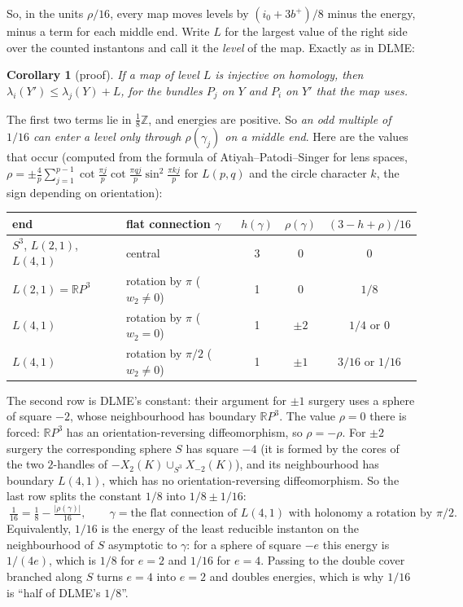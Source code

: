 \documentclass[10pt]{amsart}
\numberwithin{equation}{section}
\theoremstyle{compact}
\newtheorem{corollary}[theorem]{Corollary}
\theoremstyle{definition}
\newcommand{\Z}{\mathbb Z}
\newcommand{\R}{\mathbb R}
\begin{document}
So, in the units $\rho/16$, every map moves levels by
$(i_0+3b^+)/8$ minus the energy, minus a term for each middle end. Write
$L$ for the largest value of the right side over the counted instantons and
call it the \emph{level} of the map. Exactly as in DLME:

\begin{corollary}[proof]\label{cor:compare}
If a map of level $L$ is injective on homology, then
$\lambda_i(Y')\le\lambda_j(Y)+L$, for the bundles $P_j$ on $Y$ and $P_i$ on
$Y'$ that the map uses.
\end{corollary}

The first two terms lie in $\frac18\Z$, and energies are positive. So
\emph{an odd multiple of $1/16$ can enter a level only through
$\rho(\gamma_j)$ on a middle end}. Here are the values that occur
(computed from the formula of Atiyah--Patodi--Singer for lens spaces,
$\rho=\pm\frac4p\sum_{j=1}^{p-1}\cot\frac{\pi j}{p}\cot\frac{\pi qj}{p}
\sin^2\frac{\pi kj}{p}$ for $L(p,q)$ and the circle character $k$, the sign
depending on orientation):

\begin{center}\small
\begin{tabular}{llccc}
end & flat connection $\gamma$ & $h(\gamma)$ & $\rho(\gamma)$ &
$(3-h+\rho)/16$\\\hline
$S^3$, $L(2,1)$, $L(4,1)$ & central & 3 & 0 & 0\\
$L(2,1)=\R P^3$ & rotation by $\pi$ ($w_2\ne0$) & 1 & 0 & $1/8$\\
$L(4,1)$ & rotation by $\pi$ ($w_2=0$) & 1 & $\pm2$ & $1/4$ or $0$\\
$L(4,1)$ & rotation by $\pi/2$ ($w_2\ne0$) & 1 & $\pm1$ & $3/16$ or $1/16$
\end{tabular}
\end{center}

The second row is DLME's constant: their argument for $\pm1$ surgery uses a
sphere of square $-2$, whose neighbourhood has boundary $\R P^3$. The value
$\rho=0$ there is forced: $\R P^3$ has an orientation-reversing
diffeomorphism, so $\rho=-\rho$. For $\pm2$ surgery the corresponding sphere
$S$ has square $-4$ (it is formed by the cores of the two $2$-handles of
$-X_2(K)\cup_{S^3}X_{-2}(K)$), and its neighbourhood has boundary $L(4,1)$,
which has no orientation-reversing diffeomorphism. So the last row splits
the constant $1/8$ into $1/8\pm1/16$:
\[
\boxed{\ \tfrac1{16}=\tfrac18-\tfrac{|\rho(\gamma)|}{16},\qquad
\gamma=\text{the flat connection of } L(4,1)\text{ with holonomy a rotation by }\pi/2.\ }
\]
Equivalently, $1/16$ is the energy of the least reducible instanton on the
neighbourhood of $S$ asymptotic to $\gamma$: for a sphere of square $-e$
this energy is $1/(4e)$, which is $1/8$ for $e=2$ and $1/16$ for $e=4$.
Passing to the double cover branched along $S$ turns $e=4$ into $e=2$ and
doubles energies, which is why $1/16$ is ``half of DLME's $1/8$''.
\end{document}
